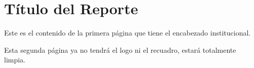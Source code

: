 \documentclass{article}
\begin{document}
\thispagestyle{primera_pagina}
\setlength{\headheight}{50pt} %

\section*{Título del Reporte}
Este es el contenido de la primera página que tiene el encabezado institucional.

\newpage %
\setlength{\headheight}{0pt} 
Esta segunda página ya no tendrá el logo ni el recuadro, estará totalmente limpia.
\end{document}
